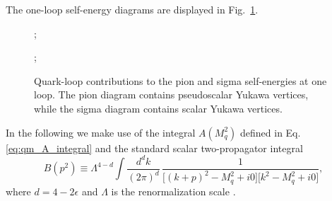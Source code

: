 The one-loop self-energy diagrams are displayed in
Fig.~\ref{fig:qm_selfenergy_diagrams}.

\begin{figure}[H]
\centering
\begin{minipage}{0.47\textwidth}
\centering
{};
\end{minipage}
\hfill
\begin{minipage}{0.47\textwidth}
\centering
{};
\end{minipage}
\caption{Quark-loop contributions to the pion and sigma self-energies at one loop. The pion diagram contains pseudoscalar Yukawa vertices, while the sigma diagram contains scalar Yukawa vertices.}
\label{fig:qm_selfenergy_diagrams}
\end{figure}

In the following we make use of the integral \(A(M_q^2)\) defined in 
Eq. \eqref{eq:qm_A_integral} and the standard scalar two-propagator integral
\begin{equation}
B(p^2)
\equiv
\Lambda^{4-d}
\int \frac{d^d k}{(2\pi)^d}\,
\frac{1}{\bigl[(k+p)^2-M_q^2+i0\bigr]\bigl[k^2-M_q^2+i0\bigr]},
\label{eq:qm_B_def}
\end{equation}
where \(d=4-2\epsilon\) and \(\Lambda\) is the renormalization scale
\cite{Folkestad2018,Andersen2024}.

